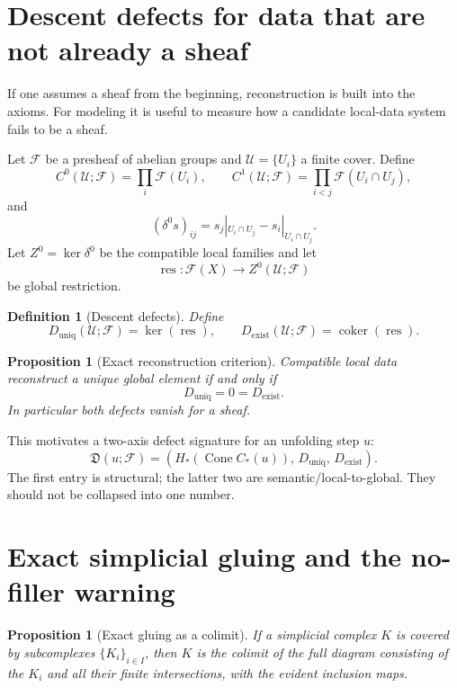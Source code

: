 \documentclass[11pt]{article}
\newtheorem{proposition}[theorem]{Proposition}
\newtheorem{definition}[theorem]{Definition}
\newcommand{\Cone}{\operatorname{Cone}}
\newcommand{\coker}{\operatorname{coker}}
\begin{document}
\section{Descent defects for data that are not already a sheaf}

If one assumes a sheaf from the beginning, reconstruction is built into the axioms.  For modeling it is useful to measure how a candidate local-data system fails to be a sheaf.

Let $\mathcal F$ be a presheaf of abelian groups and $\mathcal U=\{U_i\}$ a finite cover.  Define
\[
C^0(\mathcal U;\mathcal F)=\prod_i\mathcal F(U_i),\qquad
C^1(\mathcal U;\mathcal F)=\prod_{i<j}\mathcal F(U_i\cap U_j),
\]
and
\[
(\delta^0s)_{ij}=s_j|_{U_i\cap U_j}-s_i|_{U_i\cap U_j}.
\]
Let $Z^0=\ker\delta^0$ be the compatible local families and let
\[
\operatorname{res}:\mathcal F(X)\to Z^0(\mathcal U;\mathcal F)
\]
be global restriction.

\begin{definition}[Descent defects]
Define
\[
D_{\mathrm{uniq}}(\mathcal U;\mathcal F)=\ker(\operatorname{res}),
\qquad
D_{\mathrm{exist}}(\mathcal U;\mathcal F)=\coker(\operatorname{res}).
\]
\end{definition}

\begin{proposition}[Exact reconstruction criterion]
Compatible local data reconstruct a unique global element if and only if
\[
D_{\mathrm{uniq}}=0=D_{\mathrm{exist}}.
\]
In particular both defects vanish for a sheaf.
\end{proposition}

This motivates a two-axis defect signature for an unfolding step $u$:
\[
\mathfrak D(u;\mathcal F)
=\left(
H_*(\Cone C_*(u)),\,
D_{\mathrm{uniq}},\,
D_{\mathrm{exist}}
\right).
\]
The first entry is structural; the latter two are semantic/local-to-global.  They should not be collapsed into one number.

\section{Exact simplicial gluing and the no-filler warning}

\begin{proposition}[Exact gluing as a colimit]
If a simplicial complex $K$ is covered by subcomplexes $\{K_i\}_{i\in I}$, then $K$ is the colimit of the full diagram consisting of the $K_i$ and all their finite intersections, with the evident inclusion maps.
\end{proposition}
\end{document}
